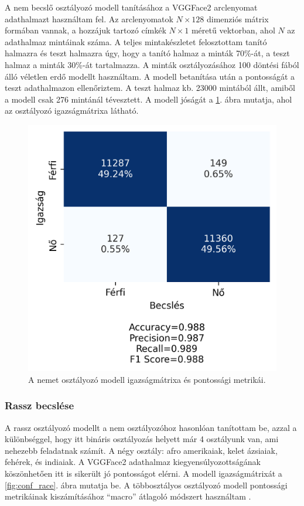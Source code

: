 A nem becslő osztályozó modell tanításához a VGGFace2 arclenyomat adathalmazt használtam fel. Az arclenyomatok $N\times128$ dimenziós mátrix formában vannak, a hozzájuk tartozó címkék $N\times1$ méretű vektorban, ahol $N$ az adathalmaz mintáinak száma. A teljes mintakészletet felosztottam tanító halmazra és teszt halmazra úgy, hogy a tanító halmaz a minták 70\%-át, a teszt halmaz a minták 30\%-át tartalmazza. A minták osztályozásához 100 döntési fából álló véletlen erdő modellt használtam. A modell betanítása után a pontosságát a teszt adathalmazon ellenőriztem. A teszt halmaz kb. 23000 mintából állt, amiből a modell csak 276 mintánál tévesztett. A modell jóságát a \ref{fig:conf_sex}. ábra mutatja, ahol az osztályozó igazságmátrixa látható. 

\begin{figure}[ht]
	\centering
	\includegraphics[width=0.5\columnwidth]{figures/conf_sex.png}
	\caption{A nemet osztályozó modell igazságmátrixa és pontossági metrikái.}
	\label{fig:conf_sex}
\end{figure}

\subsubsection*{Rassz becslése}
A rassz osztályozó modellt a nem osztályozóhoz hasonlóan tanítottam be, azzal a különbséggel, hogy itt bináris osztályozás helyett már 4 osztályunk van, ami nehezebb feladatnak számít. A négy osztály: afro amerikaiak, kelet ázsiaiak, fehérek, és indiaiak. A VGGFace2 adathalmaz kiegyensúlyozottságának köszönhetően itt is sikerült jó pontosságot elérni. A modell igazságmátrixát a \ref{fig:conf_race}. ábra mutatja be. A többosztályos osztályozó modell pontossági metrikáinak kiszámításához ``macro'' átlagoló módszert használtam \cite{scikit_average}.

